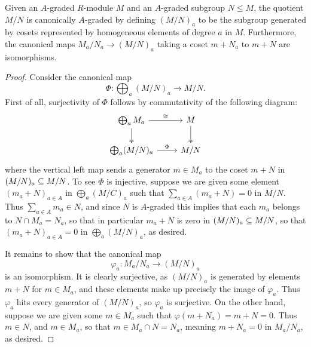 \documentclass[../main.tex]{subfiles}
\begin{document}
\begin{proposition}\label{quotient_of_A_graded_is_A_graded}
	Given an $A$-graded $R$-module $M$ and an $A$-graded subgroup $N\leq M$, the quotient $M/N$ is canonically $A$-graded by defining $(M/N)_a$ to be the subgroup generated by cosets represented by homogeneous elements of degree $a$ in $M$. Furthermore, the canonical maps $M_a/N_a\to (M/N)_a$ taking a coset $m+N_a$ to $m+N$ are isomorphisms.
\end{proposition}
\begin{proof}
	Consider the canonical map
	\[\Phi:\bigoplus_a (M/N)_a\to M/N.\]
	First of all, surjectivity of $\Phi$ follows by commutativity of the following diagram:
	\[\begin{tikzcd}
		{\bigoplus_a M_a} & M \\
		{\bigoplus_a(M/N)_a} & {M/N}
		\arrow["\cong", from=1-1, to=1-2]
		\arrow[two heads, from=1-2, to=2-2]
		\arrow[two heads, from=1-1, to=2-1]
		\arrow["\Phi", from=2-1, to=2-2]
	\end{tikzcd}\]
	where the vertical left map sends a generator $m\in M_a$ to the coset $m+N$ in $(M/N)_a\subseteq M/N$. To see $\Phi$ is injective, suppose we are given some element $(m_a+N)_{a\in A}$ in $\bigoplus_a(M/C)_a$ such that $\sum_{a\in A}(m_a+N)=0$ in $M/N$. Thus $\sum_{a\in A}m_a\in N$, and since $N$ is $A$-graded this implies that each $m_a$ belongs to $N\cap M_a=N_a$, so that in particular $m_a+N$ is zero in $(M/N)_a\subseteq M/N$, so that $(m_a+N)_{a\in A}=0$ in $\bigoplus_{a}(M/N)_a$, as desired.

	It remains to show that the canonical map
	\[\varphi_a:M_a/N_a\to (M/N)_a\]
	is an isomorphism. It is clearly surjective, as $(M/N)_a$ is generated by elements $m+N$ for $m\in M_a$, and these elements make up precisely the image of $\varphi_a$. Thus $\varphi_a$ hits every generator of $(M/N)_a$, so $\varphi_a$ is surjective. On the other hand, suppose we are given some $m\in M_a$ such that $\varphi(m+N_a)=m+N=0$. Thus $m\in N$, and $m\in M_a$, so that $m\in M_a\cap N=N_a$, meaning $m+N_a=0$ in $M_a/N_a$, as desired.
\end{proof}
\end{document}
